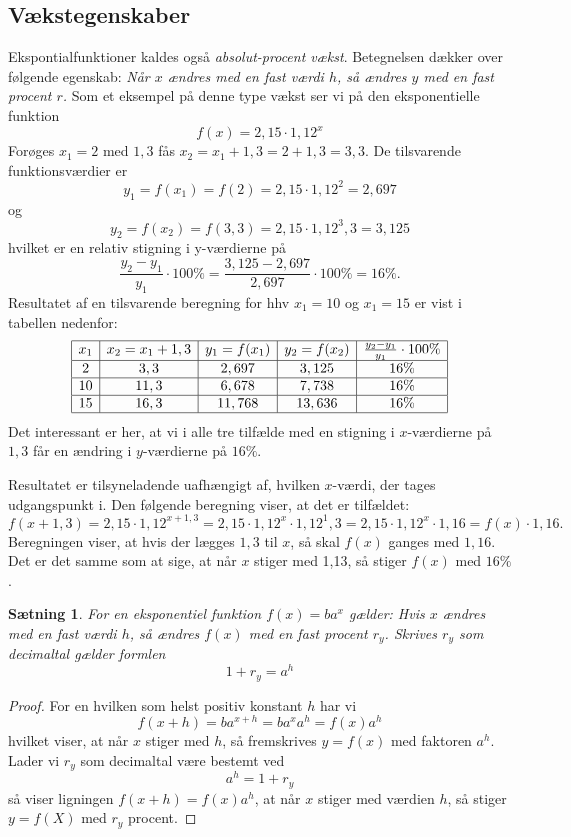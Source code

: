 \documentclass[12pt,oneside,a4paper]{article}
\newtheorem{thm}{Sætning}[section]
\begin{document}
\subsection{Vækstegenskaber}
Ekspontialfunktioner kaldes også {\em absolut-procent vækst}. Betegnelsen dækker over følgende egenskab:
{\em Når $x$ ændres med en fast værdi $h$, så ændres $y$ med en fast procent $r$.}
Som et eksempel på denne type vækst ser vi på den eksponentielle funktion
$$
f(x) = 2,15 \cdot 1,12^x
$$
Forøges $x_1 = 2$ med $1,3$ fås $x_2 = x_1 + 1,3 = 2 + 1,3 = 3,3$. De tilsvarende 
funktionsværdier er 
$$
y_1 = f(x_1) = f(2) = 2,15 \cdot 1,12^2 = 2,697
$$
og
$$
y_2 = f(x_2) = f(3,3) = 2,15 \cdot 1,12^3,3 = 3,125
$$
hvilket er en relativ stigning i y-værdierne på 
$$
\frac{y_2-y_1}{y_1} \cdot 100\% = \frac{3,125 - 2,697}{2,697} \cdot 100 \% = 16 \%.
$$
Resultatet af en tilsvarende beregning for hhv $x_1 = 10$ og $x_1 = 15$ er vist i tabellen nedenfor:
$$
\begin{array}{|c|c|c|c|c|}
    \hline 
    x_1 & x_2 = x_1 + 1,3 & y_1 = f(x_1) & y_2 = f(x_2) & \frac{y_2-y_1}{y_1} \cdot 100 \% \\
    \hline 
    2 & 3,3 & 2,697 & 3,125 & 16\% \\
    \hline 
    10 & 11,3 & 6,678 & 7,738 & 16\% \\
    \hline 
    15 & 16,3 & 11,768 & 13,636 & 16\% \\
    \hline
\end{array}
$$
Det interessant er her, at vi i alle tre tilfælde med en stigning i $x$-værdierne på $1,3$ får en ændring
i $y$-værdierne på $16\%$.

Resultatet er tilsyneladende uafhængigt af, hvilken $x$-værdi, der tages udgangspunkt i. Den følgende beregning viser,
at det er tilfældet:
$$
f(x + 1,3) = 2,15 \cdot 1,12^{x+1,3} = 2,15 \cdot 1,12^x \cdot 1,12^1,3 = 2,15 \cdot 1,12^x \cdot 1,16 = f(x) \cdot 1,16.
$$
Beregningen viser, at hvis der lægges $1,3$ til $x$, så skal $f(x)$ ganges med $1,16$. Det er det samme som at sige,
at når $x$ stiger med 1,13, så stiger $f(x)$ med $16\%$.

\begin{thm}
    For en eksponentiel funktion $f(x) = ba^x$ gælder:
    Hvis $x$ ændres med en fast værdi $h$, så ændres $f(x)$ med en fast procent $r_y$. Skrives $r_y$ som decimaltal gælder formlen
    $$
    1+r_y = a^h
    $$
\end{thm}
\begin{proof}
    For en hvilken som helst positiv konstant $h$ har vi
    $$
    f(x+h) = ba^{x+h} = ba^x a^h = f(x) a^h
    $$
    hvilket viser, at når $x$ stiger med $h$, så fremskrives $y=f(x)$ med faktoren $a^h$. Lader vi $r_y$ som decimaltal være bestemt
    ved
    $$
    a^h = 1+r_y
    $$
    så viser ligningen $f(x+h) = f(x) a^h$, at når $x$ stiger med værdien $h$, så stiger $y=f(X)$ med $r_y$ procent.
\end{proof}
\end{document}
